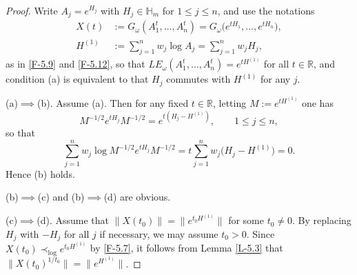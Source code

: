 \documentclass[11pt,reqno]{article}
\numberwithin{equation}{section}
\def\bR{\mathbb{R}}
\def\bH{\mathbb{H}}
\begin{document}
\begin{proof}
Write $A_j=e^{H_j}$ with $H_j\in\bH_m$ for $1\le j\le n$, and use the notations
\begin{align*}
X(t)&:=G_\omega(A_1^t,\dots,A_n^t)=G_\omega\bigl(e^{tH_1},\dots,e^{tH_n}\bigr), \\
H^{(1)}&:=\sum_{j=1}^nw_j\log A_j=\sum_{j=1}^nw_jH_j,
\end{align*}
as in \eqref{F-5.9} and \eqref{F-5.12}, so that $LE_\omega(A_1^t,\dots,A_n^t)=e^{tH^{(1)}}$ for all $t\in\bR$,
and condition (a) is equivalent to that $H_j$ commutes with $H^{(1)}$ for any $j$.

(a)$\implies$(b).\enspace
Assume (a). Then for any fixed $t\in\bR$, letting $M:=e^{tH^{(1)}}$ one has
\[
M^{-1/2}e^{tH_j}M^{-1/2}=e^{t(H_j-H^{(1)})},\qquad1\le j\le n,
\]
so that
\[
\sum_{j=1}^nw_j\log M^{-1/2}e^{tH_j}M^{-1/2}=t\sum_{j=1}^nw_j\bigl(H_j-H^{(1)}\bigr)=0.
\]
Hence (b) holds.

(b)$\implies$(c) and (b)$\implies$(d) are obvious.

(c)$\implies$(d).\enspace
Assume that $\|X(t_0)\|=\big\|e^{t_0H^{(1)}}\big\|$ for some $t_0\ne0$. By replacing $H_j$ with $-H_j$ for all
$j$ if necessary, we may assume $t_0>0$. Since $X(t_0)\prec_{\log}e^{t_0H^{(1)}}$ by \eqref{F-5.7}, it follows
from Lemma \ref{L-5.3} that $\big\|X(t_0)^{1/t_0}\big\|=\big\|e^{H^{(1)}}\big\|$.


\end{proof}
\end{document}
